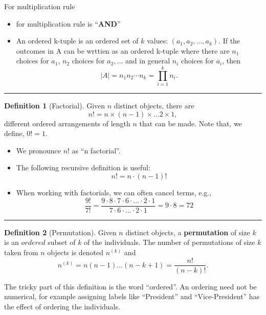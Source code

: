 \documentclass[
]{book}
\providecommand{\tightlist}{%
  \setlength{\itemsep}{0pt}\setlength{\parskip}{0pt}}
\theoremstyle{definition}
\newtheorem{definition}{Definition}[chapter]
\theoremstyle{definition}
\theoremstyle{definition}
\theoremstyle{definition}
\theoremstyle{remark}
\begin{document}
For multiplication rule

\begin{itemize}
\tightlist
\item
  for multiplication rule is ``\textbf{AND}''
\item
  An ordered k-tuple is an ordered set of \(k\) values: \((a_1,a_2,\dots,a_k)\). If the outcomes in A can be wrttien as an ordered k-tuple where there are \(n_1\) choices for \(a_1\), \(n_2\) choices for \(a_2,\dots\) and in general \(n_i\) choices for \(a_i\), then
  \[
  |A| = n_1n_2\cdots n_k = \prod_{i=1}^k n_i.
    \]
\end{itemize}

\begin{center}\rule{0.5\linewidth}{0.5pt}\end{center}

\begin{definition}[Factorial]
Given \(n\) distinct objects, there are
\[
n! = n \times (n-1) \times \ldots 2 \times 1,
\]
different ordered arrangements of length \(n\) that can be made. Note that, we define, \(0! = 1\).
\end{definition}

\begin{itemize}
\tightlist
\item
  We pronounce \(n!\) as ``n factorial''.
\item
  The following recursive definition is useful:
  \[ 
  n! = n \cdot (n-1)!
  \]

  \item

  When working with factorials, we can often cancel terms, e.g.,
  \[ \frac{9!}{7!} = \frac{9\cdot 8 \cdot 7\cdot 6 \cdot \dots \cdot 2 \cdot 1}{7\cdot 6 \cdot \dots \cdot 2 \cdot 1}=9\cdot 8 = 72\]
\end{itemize}

\begin{center}\rule{0.5\linewidth}{0.5pt}\end{center}

\begin{definition}[Permutation]
Given \(n\) distinct objects, a \textbf{permutation} of size \(k\) is an \(ordered\) subset of \(k\) of the individuals. The number of permutations of size \(k\) taken from \(n\) objects is denoted \(n^{(k)}\) and
\[
n^{(k)}=n(n-1)\dots (n-k+1) =\frac{n!}{(n-k)!}.
\]
\end{definition}

The tricky part of this definition is the word ``ordered''. An ordering need not be numerical, for example assigning labels like ``President'' and ``Vice-President'' has the effect of ordering the individuals.
\end{document}

